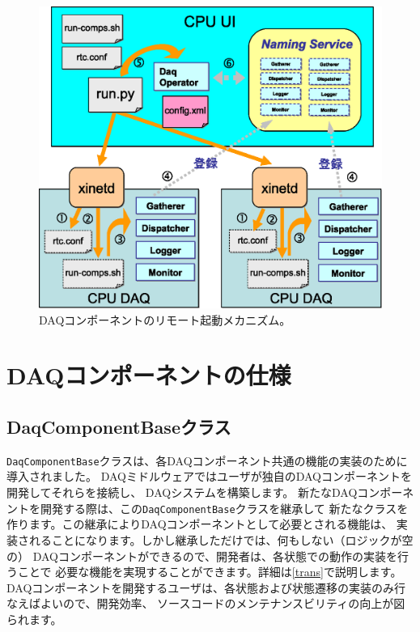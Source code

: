 \documentclass[a4j,10pt,dvips,onecolumn,oneside,final]{jarticle}%
\begin{document}
\begin{figure}[t]
  \centering
  \includegraphics[scale=0.7]{boot.eps}
  \caption{DAQコンポーネントのリモート起動メカニズム。}
  \label{remote-booting.fig}
\end{figure}


\section{DAQコンポーネントの仕様}\label{daqcomp}

\subsection{DaqComponentBaseクラス}
\verb|DaqComponentBase|クラスは、各DAQコンポーネント共通の機能の実装のために導入されました。
DAQミドルウェアではユーザが独自のDAQコンポーネントを開発してそれらを接続し、
DAQシステムを構築します。
新たなDAQコンポーネントを開発する際は、この\verb|DaqComponentBase|クラスを継承して
新たなクラスを作ります。この継承によりDAQコンポーネントとして必要とされる機能は、
実装されることになります。しかし継承しただけでは、何もしない（ロジックが空の）
DAQコンポーネントができるので、開発者は、各状態での動作の実装を行うことで
必要な機能を実現することができます。詳細は\ref{trans}で説明します。
DAQコンポーネントを開発するユーザは、各状態および状態遷移の実装のみ行なえばよいので、開発効率、
ソースコードのメンテナンスビリティの向上が図られます。
\end{document}
